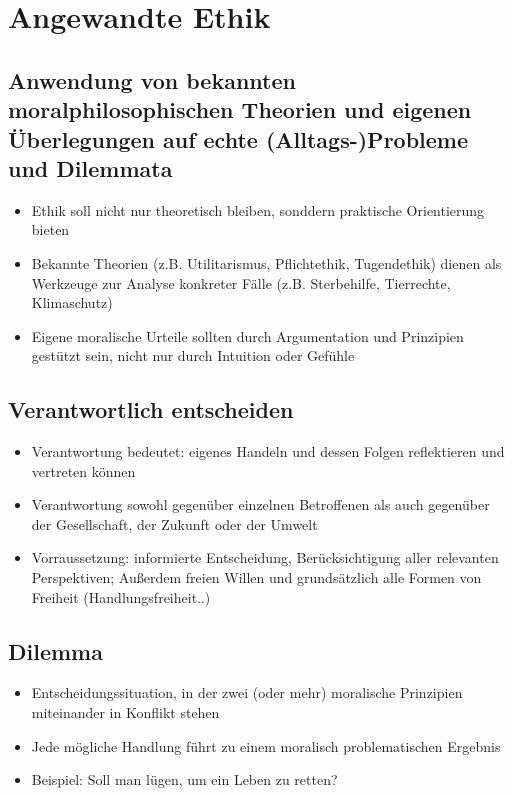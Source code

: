 
\section{Angewandte Ethik}

\subsection{Anwendung von bekannten moralphilosophischen Theorien und eigenen Überlegungen auf echte (Alltags-)Probleme und Dilemmata}
\begin{itemize}
    \item Ethik soll nicht nur theoretisch bleiben, sonddern praktische Orientierung bieten
    \item Bekannte Theorien (z.B. Utilitarismus, Pflichtethik, Tugendethik) dienen als Werkzeuge zur Analyse konkreter Fälle (z.B. Sterbehilfe, Tierrechte, Klimaschutz)
    \item Eigene moralische Urteile sollten durch Argumentation und Prinzipien gestützt sein, nicht nur durch Intuition oder Gefühle
\end{itemize}

\subsection{Verantwortlich entscheiden}
\begin{itemize}
    \item Verantwortung bedeutet: eigenes Handeln und dessen Folgen reflektieren und vertreten können
    \item Verantwortung sowohl gegenüber einzelnen Betroffenen als auch gegenüber der Gesellschaft, der Zukunft oder der Umwelt
    \item Vorraussetzung: informierte Entscheidung, Berücksichtigung aller relevanten Perspektiven; Außerdem freien Willen und grundsätzlich alle Formen von Freiheit (Handlungsfreiheit..)
\end{itemize}

\subsection{Dilemma}
\begin{itemize}
    \item Entscheidungssituation, in der zwei (oder mehr) moralische Prinzipien miteinander in Konflikt stehen
    \item Jede mögliche Handlung führt zu einem moralisch problematischen Ergebnis 
    \item Beispiel: Soll man lügen, um ein Leben zu retten?
\end{itemize}

